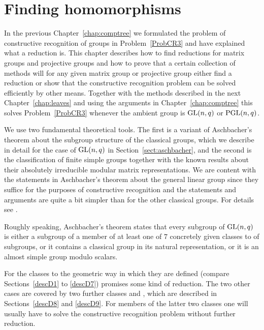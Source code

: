 
\chapter{Finding homomorphisms}
\label{chap:findhom}

In the previous Chapter~\ref{chap:comptree} we formulated the problem
of constructive recognition of groups in Problem~\ref{ProbCR3} and have
explained what a reduction is. This chapter describes how to find
reductions for matrix groups and projective groups and how to prove
that a certain collection of methods will for any given
matrix group or projective group either find a reduction
or show that the constructive 
recognition problem can be solved efficiently by other means. Together
with the methods described in the next Chapter~\ref{chap:leaves}
and using the 
arguments in Chapter~\ref{chap:comptree} this solves
Problem~\ref{ProbCR3} whenever the ambient group is $\GL(n,q)$ or
$\PGL(n,q)$.

We use two fundamental theoretical tools. The first is a variant of
Aschbacher's theorem
about the subgroup structure of the classical groups, which we describe
in detail for the case of $\GL(n,q)$ in Section~\ref{sect:aschbacher},
and the second is the classification of finite simple groups together
with the known results about their absolutely irreducible modular matrix
representations. We are
content with the statements in Aschbacher's theorem about the general
linear group since they suffice for the purposes of constructive
recognition and the statements and arguments are quite a bit simpler
than for the other classical groups. For details see \cite{aschbacher}.

Roughly speaking, Aschbacher's theorem states that every subgroup of $\GL(n,q)$
is either a subgroup of a member of at least one of $7$ concretely given
classes  to  of subgroups, or it contains a classical group
in its natural representation, or it is an almost simple group modulo
scalars.

For the classes  to  the geometric way in which they are defined
(compare
Sections~\ref{descD1} to \ref{descD7}) promises some kind of
reduction. The two other cases are covered by two further classes 
and , which are described in Sections~\ref{descD8} and \ref{descD9}.
For members of the latter two classes one will usually have to solve the
constructive recognition problem without further reduction.

